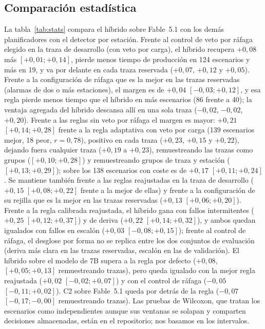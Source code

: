 \documentclass[preprint,11pt]{elsarticle}
\begin{document}
\subsection{Comparación estadística}
La tabla~\ref{tab:stats} compara el híbrido sobre Fable~5.1 con los demás planificadores con el detector por estación. Frente al control de veto por ráfaga elegido en la traza de desarrollo (con veto por carga), el híbrido recupera $+0{,}08$ más $[+0{,}01; +0{,}14]$, pierde menos tiempo de producción en 124 escenarios y más en 19, y va por delante en cada traza reservada ($+0{,}07$, $+0{,}12$ y $+0{,}05$). Frente a la configuración de ráfaga que es la mejor en las trazas reservadas (alarmas de dos o más estaciones), el margen es de $+0{,}04$ $[-0{,}03; +0{,}12]$, y esa regla pierde menos tiempo que el híbrido en más escenarios (86 frente a 40); la ventaja agregada del híbrido descansa allí en una sola traza ($-0{,}02$, $-0{,}02$, $+0{,}20$). Frente a las reglas sin veto por ráfaga el margen es mayor: $+0{,}21$ $[+0{,}14; +0{,}28]$ frente a la regla adaptativa con veto por carga (139 escenarios mejor, 18 peor, $r=0{,}78$), positivo en cada traza ($+0{,}23$, $+0{,}15$ y $+0{,}22$), dejando fuera cualquier traza ($+0{,}19$ a $+0{,}23$), remuestreando las trazas como grupos ($[+0{,}10; +0{,}28]$) y remuestreando grupos de traza y estación ($[+0{,}13; +0{,}29]$); sobre los 138 escenarios con coste es de $+0{,}17$ $[+0{,}11; +0{,}24]$. Se mantiene también frente a las reglas reajustadas en la traza de desarrollo ($+0{,}15$ $[+0{,}08; +0{,}22]$ frente a la mejor de ellas) y frente a la configuración de su rejilla que es la mejor en las trazas reservadas ($+0{,}13$ $[+0{,}06; +0{,}20]$). Frente a la regla calibrada reajustada, el híbrido gana con fallos intermitentes ($+0{,}25$ $[+0{,}12; +0{,}37]$) y de deriva ($+0{,}22$ $[+0{,}14; +0{,}32]$), y ambos quedan igualados con fallos en escalón ($+0{,}03$ $[-0{,}08; +0{,}15]$); frente al control de ráfaga, el desglose por forma no se replica entre los dos conjuntos de evaluación (deriva más clara en las trazas reservadas, escalón en las de validación). El híbrido sobre el modelo de 7B supera a la regla por defecto ($+0{,}08$, $[+0{,}05; +0{,}13]$ remuestreando trazas), pero queda igualado con la mejor regla reajustada ($+0{,}02$ $[-0{,}02; +0{,}07]$) y con el control de ráfaga ($-0{,}05$ $[-0{,}11; +0{,}02]$). C2 sobre Fable~5.1 queda por detrás de la regla ($-0{,}07$ $[-0{,}17; -0{,}00]$ remuestreando trazas). Las pruebas de Wilcoxon, que tratan los escenarios como independientes aunque sus ventanas se solapan y comparten decisiones almacenadas, están en el repositorio; nos basamos en los intervalos.
\end{document}
